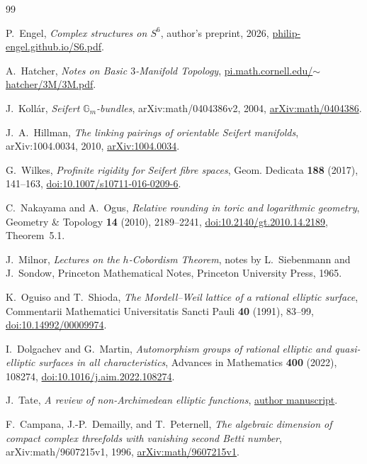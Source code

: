 \documentclass[11pt]{article}
\numberwithin{equation}{section}
\begin{document}
\begin{thebibliography}{99}
\raggedright

P.~Engel,
\emph{Complex structures on $S^6$},
author's preprint, 2026,
\href{https://philip-engel.github.io/S6.pdf}{philip-engel.github.io/S6.pdf}.

A.~Hatcher,
\emph{Notes on Basic $3$-Manifold Topology},
\href{https://pi.math.cornell.edu/~hatcher/3M/3M.pdf}
{pi.math.cornell.edu/$\sim$hatcher/3M/3M.pdf}.

J.~Koll\'ar,
\emph{Seifert $\mathbb G_m$-bundles},
arXiv:math/0404386v2, 2004,
\href{https://arxiv.org/abs/math/0404386}{arXiv:math/0404386}.

J.~A.~Hillman,
\emph{The linking pairings of orientable Seifert manifolds},
arXiv:1004.0034, 2010,
\href{https://arxiv.org/abs/1004.0034}{arXiv:1004.0034}.


G.~Wilkes,
\emph{Profinite rigidity for Seifert fibre spaces},
Geom. Dedicata \textbf{188} (2017), 141--163,
\href{https://doi.org/10.1007/s10711-016-0209-6}
{doi:10.1007/s10711-016-0209-6}.

C.~Nakayama and A.~Ogus,
\emph{Relative rounding in toric and logarithmic geometry},
Geometry \& Topology \textbf{14} (2010), 2189--2241,
\href{https://doi.org/10.2140/gt.2010.14.2189}{doi:10.2140/gt.2010.14.2189},
Theorem~5.1.

J.~Milnor,
\emph{Lectures on the $h$-Cobordism Theorem},
notes by L.~Siebenmann and J.~Sondow,
Princeton Mathematical Notes, Princeton University Press, 1965.

K.~Oguiso and T.~Shioda,
\emph{The Mordell--Weil lattice of a rational elliptic surface},
Commentarii Mathematici Universitatis Sancti Pauli \textbf{40} (1991), 83--99,
\href{https://doi.org/10.14992/00009974}{doi:10.14992/00009974}.

I.~Dolgachev and G.~Martin,
\emph{Automorphism groups of rational elliptic and quasi-elliptic
surfaces in all characteristics},
Advances in Mathematics \textbf{400} (2022), 108274,
\href{https://doi.org/10.1016/j.aim.2022.108274}
{doi:10.1016/j.aim.2022.108274}.

J.~Tate,
\emph{A review of non-Archimedean elliptic functions},
\href{https://web.ma.utexas.edu/users/voloch/Preprints/nonarch-ams.pdf}
{author manuscript}.

F.~Campana, J.-P.~Demailly, and T.~Peternell,
\emph{The algebraic dimension of compact complex threefolds with
vanishing second Betti number},
arXiv:math/9607215v1, 1996,
\href{https://arxiv.org/abs/math/9607215v1}{arXiv:math/9607215v1}.


\end{thebibliography}
\end{document}
